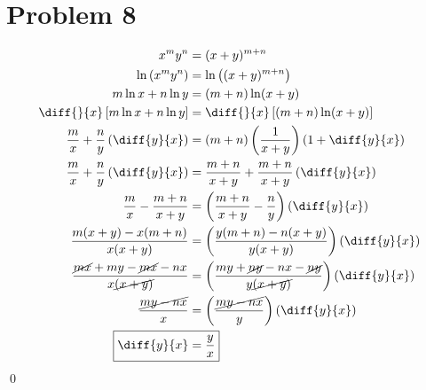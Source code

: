 \documentclass{article}
\begin{document}
\section*{Problem 8}
\begin{align*}
	x^my^n&=(x+y)^{m+n} \\
	\ln\left(x^my^n\right)&=\ln\left((x+y)^{m+n}\right) \\
	m\ln x+n\ln y&=(m+n)\ln(x+y) \\
	\diff{}{x}\left[m\ln x+n\ln y\right]&=\diff{}{x}\left[(m+n)\ln(x+y)\right] \\
	\frac{m}{x}+\frac{n}{y}\left(\diff{y}{x}\right)&=(m+n)\left(\frac{1}{x+y}\right)\left(1+\diff{y}{x}\right) \\
	\frac{m}{x}+\frac{n}{y}\left(\diff{y}{x}\right)&=\frac{m+n}{x+y}+\frac{m+n}{x+y}\left(\diff{y}{x}\right) \\
	\frac{m}{x}-\frac{m+n}{x+y}&=\left(\frac{m+n}{x+y}-\frac{n}{y}\right)\left(\diff{y}{x}\right) \\
	\frac{m(x+y)-x(m+n)}{x(x+y)}&=\left(\frac{y(m+n)-n(x+y)}{y(x+y)}\right)\left(\diff{y}{x}\right) \\
	\frac{\cancel{mx}+my-\cancel{mx}-nx}{x\cancel{(x+y)}}&=\left(\frac{my+\cancel{ny}-nx-\cancel{ny}}{y\cancel{(x+y)}}\right)\left(\diff{y}{x}\right) \\
	\frac{\cancel{my-nx}}{x}&=\left(\frac{\cancel{my-nx}}{y}\right)\left(\diff{y}{x}\right) \\
	\Aboxed{\diff{y}{x}&=\frac{y}{x}}
\end{align*}
\qed
\end{document}
